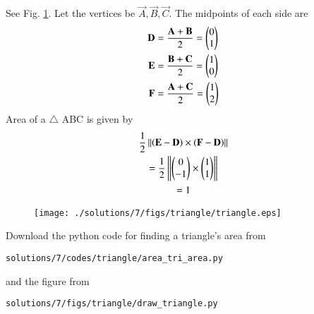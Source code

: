 See Fig. \ref{fig:1.2.7}. Let the vertices be $\vec{A},\vec{B},\vec{C}$.
 The midpoints of each side are
\begin{align}
\mathbf{D} &= \frac{\mathbf{A}+\mathbf{B}}{2} = \begin{pmatrix}0\\1\end{pmatrix} \\
\mathbf{E} &= \frac{\mathbf{B}+\mathbf{C}}{2} = \begin{pmatrix}1\\0\end{pmatrix} \\
\mathbf{F} &= \frac{\mathbf{A}+\mathbf{C}}{2} = \begin{pmatrix}1\\2\end{pmatrix} \\
\end{align}
 Area of a $\triangle$ ABC is given by 
\begin{multline}
 \frac{1}{2} \left\lVert\left(\mathbf{E}-\mathbf{D}\right)\times\left(\mathbf{F}-\mathbf{D}\right)\right\rVert\\
= \frac{1}{2}\left\lVert\begin{pmatrix}0\\-1\end{pmatrix} \times \begin{pmatrix}1\\1\end{pmatrix}\right\rVert
\\
= 1
\end{multline}

\begin{figure}[!ht]
\centering
\texttt{[image: ./solutions/7/figs/triangle/triangle.eps]}
\caption{}
\label{fig:1.2.7}
\end{figure}

 Download the python code for finding a triangle's area from
\begin{lstlisting}
solutions/7/codes/triangle/area_tri_area.py
\end{lstlisting}
and the figure from
\begin{lstlisting}
solutions/7/figs/triangle/draw_triangle.py
\end{lstlisting}

